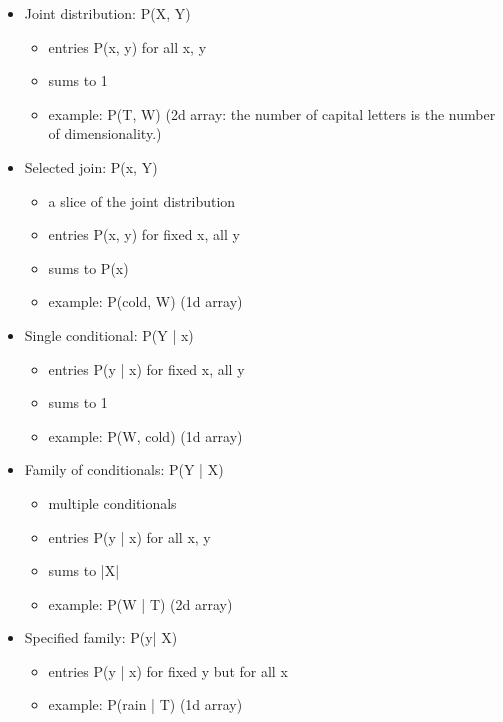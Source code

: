 \documentclass[11pt,a4paper]{report}
\begin{document}
\begin{itemize}
    \item Joint distribution: P(X, Y)
        \begin{itemize}
            \item entries P(x, y) for all x, y
            \item sums to 1
            \item example: P(T, W) (2d array: the number of capital letters is the number of dimensionality.)
        \end{itemize}
    
    \item Selected join: P(x, Y)
        \begin{itemize}
            \item a slice of the joint distribution
            \item entries P(x, y) for fixed x, all y
            \item sums to P(x)
            \item example: P(cold, W) (1d array)
        \end{itemize}

    \item Single conditional: P(Y | x)
        \begin{itemize}
            \item entries P(y | x) for fixed x, all y
            \item sums to 1
            \item example: P(W, cold) (1d array)
        \end{itemize}

    \item Family of conditionals: P(Y | X)
        \begin{itemize}
            \item multiple conditionals
            \item entries P(y | x) for all x, y
            \item sums to |X|
            \item example: P(W | T) (2d array)
        \end{itemize}

    \item Specified family: P(y| X)
        \begin{itemize}
            \item entries P(y | x) for fixed y but for all x
            \item example: P(rain | T) (1d array)
        \end{itemize}
    

\end{itemize}
\end{document}

